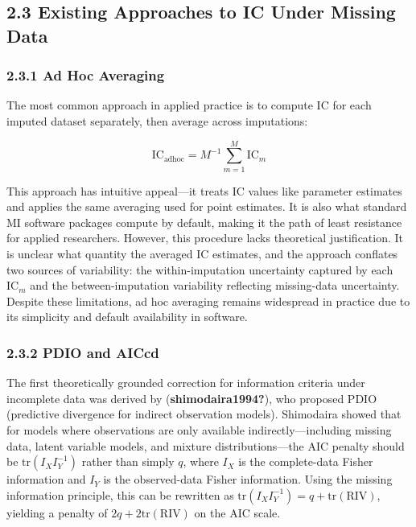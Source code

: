 \documentclass[
]{article}
\begin{document}
\subsection{2.3 Existing Approaches to IC Under Missing
Data}\label{existing-approaches-to-ic-under-missing-data}

\subsubsection{2.3.1 Ad Hoc Averaging}\label{ad-hoc-averaging}

The most common approach in applied practice is to compute IC for each
imputed dataset separately, then average across imputations:

\[\text{IC}_{\text{adhoc}} = M^{-1}\sum_{m=1}^M \text{IC}_m\]

This approach has intuitive appeal---it treats IC values like parameter
estimates and applies the same averaging used for point estimates. It is
also what standard MI software packages compute by default, making it
the path of least resistance for applied researchers. However, this
procedure lacks theoretical justification. It is unclear what quantity
the averaged IC estimates, and the approach conflates two sources of
variability: the within-imputation uncertainty captured by each
\(\text{IC}_m\) and the between-imputation variability reflecting
missing-data uncertainty. Despite these limitations, ad hoc averaging
remains widespread in practice due to its simplicity and default
availability in software.

\subsubsection{2.3.2 PDIO and AICcd}\label{pdio-and-aiccd}

The first theoretically grounded correction for information criteria
under incomplete data was derived by (\textbf{shimodaira1994?}), who
proposed PDIO (predictive divergence for indirect observation models).
Shimodaira showed that for models where observations are only available
indirectly---including missing data, latent variable models, and mixture
distributions---the AIC penalty should be \(\text{tr}(I_X I_Y^{-1})\)
rather than simply \(q\), where \(I_X\) is the complete-data Fisher
information and \(I_Y\) is the observed-data Fisher information. Using
the missing information principle, this can be rewritten as
\(\text{tr}(I_X I_Y^{-1}) = q + \text{tr}(\text{RIV})\), yielding a
penalty of \(2q + 2\text{tr}(\text{RIV})\) on the AIC scale.
\end{document}

